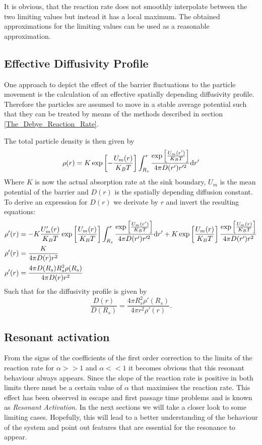 It is obvious, that the reaction rate does not smoothly interpolate between the two limiting values but instead it has a local maximum. The obtained approximations for the limiting values can be used as a reasonable approximation.
\subsection{Effective Diffusivity Profile}
One approach to depict the effect of the barrier fluctuations to the particle movement is the calculation of an effective spatially depending diffusivity profile. Therefore the particles are assumed to move in a stable average potential such that they can be treated by means of the methods described in section \ref{The_Debye_Reaction_Rate}.\par
The total particle density is then given by
\begin{equation}
    \rho(r) = K\exp \left[ -\frac{U_m(r)}{K_B T} \right] \int_{R_s}^{r} \frac{\exp \left[ \frac{U_m(r')}{K_B T}\right]}{4 \pi D(r')r'^2} {\rm d} r'
\end{equation}
Where $K$ is now the actual absorption rate at the sink boundary, $U_m$ is the mean potential of the barrier and $D(r)$ is the spatially depending diffusion constant. To derive an expression for $D(r)$ we derivate by $r$ and invert the resulting equations:
\begin{align*}
    \rho'(r) &= -K\frac{U'_m(r)}{K_B T}\exp \left[ \frac{U_m(r)}{K_B T} \right] \int_{R_s}^{r} \frac{\exp \left[ \frac{U_m(r')}{K_B T}\right]}{4 \pi D(r')r'^2} {\rm d} r' + K \exp\left[ \frac{U_m(r)}{K_B T} \right] \frac{\exp \left[ \frac{U_m(r)}{K_B T}\right]}{4 \pi D(r')r^2} \\
\rho'(r) &= \frac{K}{4 \pi D(r) r^2} \\
\rho'(r) &= \frac{4 \pi D(R_s) R_s^2 \rho(R_s)}{4 \pi D(r) r^2}
\end{align*}
Such that for the diffusivity profile is given by
\begin{equation}
    \frac{D(r)}{D(R_s)} = \frac{4 \pi R_s^2 \rho'(R_s)}{ 4 \pi r^2 \rho'(r)}.
    \label{spatial_diffusivity_profile}
\end{equation}


\subsection{Resonant activation}
From the signs of the coefficients of the first order correction to the limits of the reaction rate for $\alpha>>1$ and $\alpha<<1$ it becomes obvious that this resonant behaviour always appears. Since the slope of the reaction rate is positive in both limits there must be a certain value of $\alpha$ that maximises the reaction rate. This effect has been observed in escape and first passage time problems and is known as \textit{Resonant Activation}.
In the next sections we will take a closer look to some limiting cases. Hopefully, this will lead to a better understanding of the behaviour of the system and point out features that are essential for the resonance to appear.

